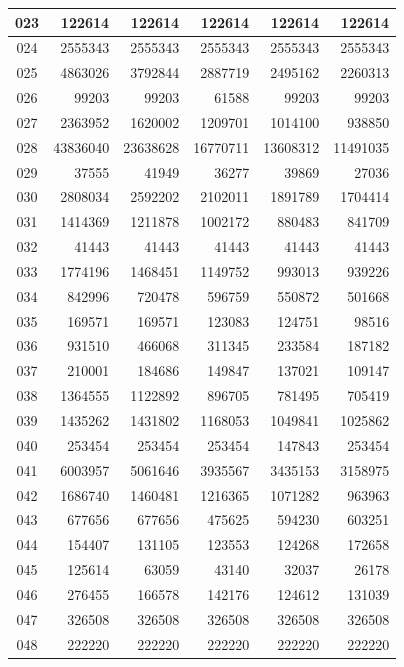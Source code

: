 \begin{longtable}{|c|r|r|r|r|r|}
\hline
023 & 122614 & 122614 & 122614 & 122614 & 122614 \\
\hline
024 & 2555343 & 2555343 & 2555343 & 2555343 & 2555343 \\
\hline
025 & 4863026 & 3792844 & 2887719 & 2495162 & 2260313 \\
\hline
026 & 99203 & 99203 & 61588 & 99203 & 99203 \\
\hline
027 & 2363952 & 1620002 & 1209701 & 1014100 & 938850 \\
\hline
028 & 43836040 & 23638628 & 16770711 & 13608312 & 11491035 \\
\hline
029 & 37555 & 41949 & 36277 & 39869 & 27036 \\
\hline
030 & 2808034 & 2592202 & 2102011 & 1891789 & 1704414 \\
\hline
031 & 1414369 & 1211878 & 1002172 & 880483 & 841709 \\
\hline
032 & 41443 & 41443 & 41443 & 41443 & 41443 \\
\hline
033 & 1774196 & 1468451 & 1149752 & 993013 & 939226 \\
\hline
034 & 842996 & 720478 & 596759 & 550872 & 501668 \\
\hline
035 & 169571 & 169571 & 123083 & 124751 & 98516 \\
\hline
036 & 931510 & 466068 & 311345 & 233584 & 187182 \\
\hline
037 & 210001 & 184686 & 149847 & 137021 & 109147 \\
\hline
038 & 1364555 & 1122892 & 896705 & 781495 & 705419 \\
\hline
039 & 1435262 & 1431802 & 1168053 & 1049841 & 1025862 \\
\hline
040 & 253454 & 253454 & 253454 & 147843 & 253454 \\
\hline
041 & 6003957 & 5061646 & 3935567 & 3435153 & 3158975 \\
\hline
042 & 1686740 & 1460481 & 1216365 & 1071282 & 963963 \\
\hline
043 & 677656 & 677656 & 475625 & 594230 & 603251 \\
\hline
044 & 154407 & 131105 & 123553 & 124268 & 172658 \\
\hline
045 & 125614 & 63059 & 43140 & 32037 & 26178 \\
\hline
046 & 276455 & 166578 & 142176 & 124612 & 131039 \\
\hline
047 & 326508 & 326508 & 326508 & 326508 & 326508 \\
\hline
048 & 222220 & 222220 & 222220 & 222220 & 222220 \\

\end{longtable}
